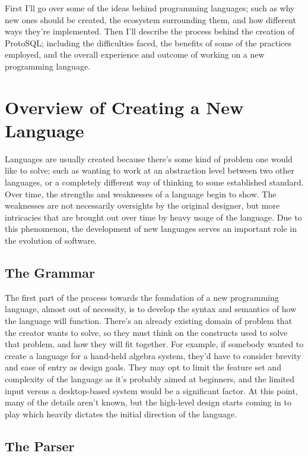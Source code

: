 \documentclass[titlepage]{article}
\begin{document}
		First I'll go over some of the ideas behind programming languages; such as why new ones should be created, the ecosystem surrounding them, and how different ways they're implemented.  Then I'll describe the process behind the creation of ProtoSQL; including the difficulties faced, the benefits of some of the practices employed, and the overall experience and outcome of working on a new programming language.

	\section{Overview of Creating a New Language}

		Languages are usually created because there's some kind of problem one would like to solve; such as wanting to work at an abstraction level between two other languages, or a completely different way of thinking to some established standard.  Over time, the strengths and weaknesses of a language begin to show.  The weaknesses are not necessarily oversights by the original designer, but more intricacies that are brought out over time by heavy usage of the language.  Due to this phenomenon, the development of new languages serves an important role in the evolution of software.

		\subsection{The Grammar}

			The first part of the process towards the foundation of a new programming language, almost out of necessity, is to develop the syntax and semantics of how the language will function.  There's an already existing domain of problem that the creator wants to solve, so they must think on the constructs used to solve that problem, and how they will fit together.  For example, if somebody wanted to create a language for a hand-held algebra system, they'd have to consider brevity and ease of entry as design goals.  They may opt to limit the feature set and complexity of the language as it's probably aimed at beginners, and the limited input versus a desktop-based system would be a significant factor.  At this point, many of the details aren't known, but the high-level design starts coming in to play which heavily dictates the initial direction of the language.



		\subsection{The Parser}
\end{document}

